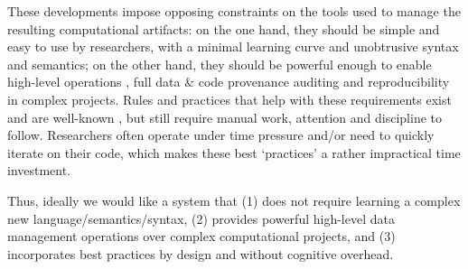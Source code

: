 \documentclass{article} %
\begin{document}
These developments impose opposing constraints on the tools used to manage the
resulting computational artifacts: on the one hand, they should be simple and
easy to use by researchers, with a minimal learning curve and unobtrusive syntax
and semantics; on the other hand, they should be powerful enough to enable
high-level operations \citep{wickham2014tidy}, full data \& code provenance
auditing \citep{davidson2008provenance} and reproducibility
\citep{ivie2018reproducibility} in complex projects.  Rules and practices that
help with these requirements exist and are well-known
\citep{sandve2013ten,wilkinson2016fair}, but still require manual work,
attention and discipline to follow. Researchers often operate under time
pressure and/or need to quickly iterate on their code, which makes these best
`practices' a rather impractical time investment. 

Thus, ideally we would like a system that (1) does not require learning a
complex new language/semantics/syntax, (2) provides powerful high-level data
management operations over complex computational projects, and (3) incorporates
best practices by design and without cognitive overhead.
\end{document}
